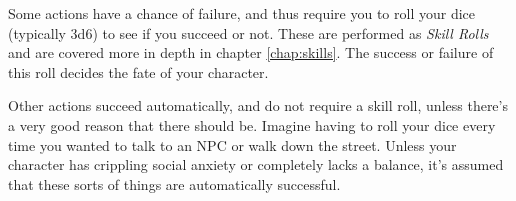 Some actions have a chance of failure, and thus require you to roll your dice (typically 3d6) to see if you succeed or not. 
These are performed as \textit{Skill Rolls} and are covered more in depth in chapter \ref{chap:skills}. 
The success or failure of this roll decides the fate of your character.

Other actions succeed automatically, and do not require a skill roll, unless there's a very good reason that there should be.
Imagine having to roll your dice every time you wanted to talk to an NPC or walk down the street. 
Unless your character has crippling social anxiety or completely lacks a balance, it's assumed that these sorts of things are automatically successful.